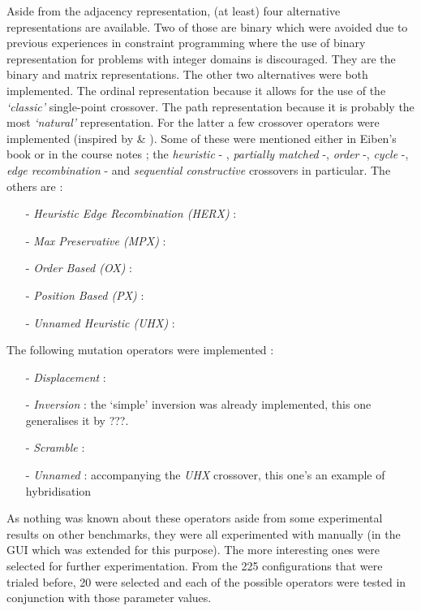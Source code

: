 
Aside from the adjacency representation, (at least) four alternative representations are available. Two of those are binary which were avoided due to previous experiences in constraint programming where the use of binary representation for problems with integer domains is discouraged. They are the binary and matrix representations. The other two alternatives were both implemented. The ordinal representation because it allows for the use of the \textit{`classic'} single-point crossover. The path representation because it is probably the most \textit{`natural'} representation. For the latter a few crossover operators were implemented (inspired by \cite{larraaga} \& \cite{imskhan}). Some of these were mentioned either in Eiben's book or in the course notes ; the \textit{heuristic} - , \textit{partially matched} -, \textit{order} -, \textit{cycle} -, \textit{edge recombination} - and \textit{sequential constructive} crossovers in particular. The others are : 
\begin{itemize}
\item[-] \textit{Heuristic Edge Recombination (HERX)} : 
\item[-] \textit{Max Preservative (MPX)} : 
\item[-] \textit{Order Based (OX)} : 
\item[-] \textit{Position Based (PX)} : 
\item[-] \textit{Unnamed Heuristic (UHX)} : 
\end{itemize}
The following mutation operators were implemented :
\begin{itemize}
\item[-] \textit{Displacement} : 
\item[-] \textit{Inversion} : the `simple' inversion was already implemented, this one generalises it by ???.
\item[-] \textit{Scramble} : 
\item[-] \textit{Unnamed} : accompanying the \textit{UHX} crossover, this one's an example of hybridisation
\end{itemize}
As nothing was known about these operators aside from some experimental results on other benchmarks, they were all experimented with manually (in the GUI which was extended for this purpose). The more interesting ones were selected for further experimentation. From the 225 configurations that were trialed before, 20 were selected and each of the possible operators were tested in conjunction with those parameter values.\\

